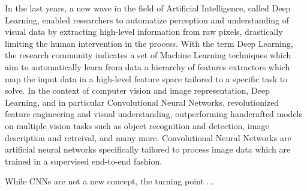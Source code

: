In the last years, a new wave in the field of Artificial Intelligence, called Deep Learning, enabled researchers to automatize perception and understanding of visual data by extracting high-level information from raw pixels, drastically limiting the human intervention in the process.
With the term Deep Learning, the research community indicates a set of Machine Learning techniques which aim to automatically learn from data a hierarchy of features extractors which map the input data in a high-level feature space tailored to a specific task to solve.
In the context of computer vision and image representation, Deep Learning, and in particular Convolutional Neural Networks, revolutionized feature engineering and visual understanding, outperforming handcrafted models on multiple vision tasks such as object recognition and detection, image description and retreival,  and many more.
Convolutional Neural Networks are artificial neural networks specifically tailored to process image data which are trained in a supervised end-to-end fashion.

While CNNs are not a new concept, the turning point ...




